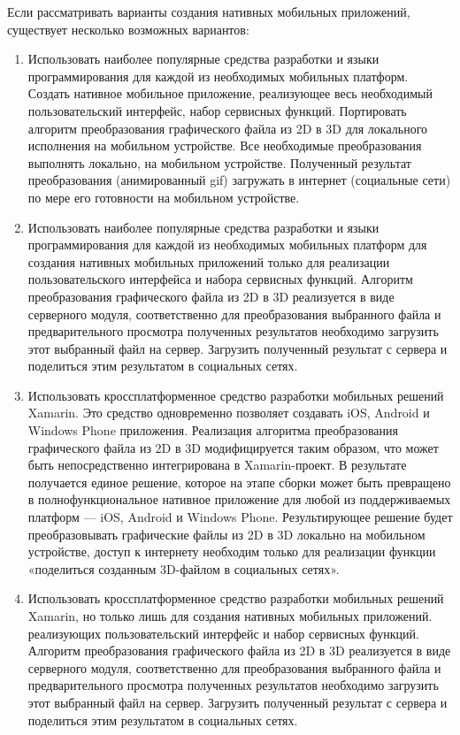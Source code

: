 Если рассматривать варианты создания нативных мобильных приложений, существует несколько возможных вариантов:

\begin{enumerate}
	\item Использовать наиболее популярные средства разработки и языки программирования для каждой из необходимых мобильных платформ. Создать нативное мобильное приложение, реализующее весь необходимый пользовательский интерфейс, набор сервисных функций. Портировать алгоритм преобразования графического файла из 2D в 3D для локального исполнения на мобильном устройстве. Все необходимые преобразования выполнять локально, на мобильном устройстве. Полученный результат преобразования (анимированный gif) загружать в интернет (социальные сети) по мере его готовности на мобильном устройстве.
	\item Использовать наиболее популярные средства разработки и языки программирования для каждой из необходимых мобильных платформ для создания нативных мобильных приложений только для реализации пользовательского интерфейса и набора сервисных функций. Алгоритм преобразования графического файла из 2D в 3D реализуется в виде серверного модуля, соответственно для преобразования выбранного файла и предварительного просмотра полученных результатов необходимо загрузить этот выбранный файл на сервер. Загрузить полученный результат с сервера и поделиться этим результатом в социальных сетях.
	\item Использовать кроссплатформенное средство разработки мобильных решений Xamarin. Это средство одновременно позволяет создавать iOS, Android и Windows Phone приложения. Реализация алгоритма преобразования графического файла из 2D в 3D модифицируется таким образом, что может быть непосредственно интегрирована в Xamarin-проект. В результате получается единое решение, которое на этапе сборки может быть превращено в полнофункциональное нативное приложение для любой из поддерживаемых платформ --- iOS, Android и Windows Phone. Результирующее решение будет преобразовывать графические файлы из 2D в 3D локально на мобильном устройстве, доступ к интернету необходим только для реализации функции «поделиться созданным 3D-файлом в социальных сетях».
	\item Использовать кроссплатформенное средство разработки мобильных решений Xamarin, но только лишь для создания нативных мобильных приложений. реализующих пользовательский интерфейс и набор сервисных функций. Алгоритм преобразования графического файла из 2D в 3D реализуется в виде серверного модуля, соответственно для преобразования выбранного файла и предварительного просмотра полученных результатов необходимо загрузить этот выбранный файл на сервер. Загрузить полученный результат с сервера и поделиться этим результатом в социальных сетях.
\end{enumerate}

